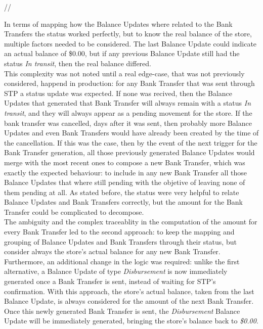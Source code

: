//

In terms of mapping how the Balance Updates where related to the Bank Transfers the status worked perfectly, but to know the real balance of the store, multiple factors needed to be considered. The last Balance Update could indicate an actual balance of \$0.00, but if any previous Balance Update still had the status \textit{In transit}, then the real balance differed.\\ 

This complexity was not noted until a real edge-case, that was not previously considered, happend in production: for any Bank Transfer that was sent through STP a status update was expected. If none was recived, then the Balance Updates that generated that Bank Transfer will always remain with a status \textit{In transit}, and they will always appear as a pending movement for the store. If the bank transfer was cancelled, days after it was sent, then probably more Balance Updates and even Bank Transfers would have already been created by the time of the cancellation. If this was the case, then by the event of the next trigger for the Bank Transfer generation, all those previously generated Balance Updates would merge with the most recent ones to compose a new Bank Transfer, which was exactly the expected behaviour: to include in any new Bank Transfer all those Balance Updates that where still pending with the objetive of leaving none of them pending at all. As stated before, the status were very helpful to relate Balance Updates and Bank Transfers correctly, but the amount for the Bank Transfer could be complicated to decompose.\\

The ambiguity and the complex traceablity in the computation of the amount for every Bank Transfer led to the second approach: to keep the mapping and grouping of Balance Updates and Bank Transfers through their status, but consider always the store's actual balance for any new Bank Transfer. Furthermore, an additional change in the logic was required: unlike the first alternative, a Balance Update of type \textit{Disbursement} is now immediately generated once a Bank Transfer is sent, instead of waiting for STP's confirmation. With this approach, the store's actual balance, taken from the last Balance Update, is always considered for the amount of the next Bank Transfer. Once this newly generated Bank Transfer is sent, the \textit{Disbursement} Balance Update will be immediately generated, bringing the store's balance back to \textit{\$0.00}.\\ 


